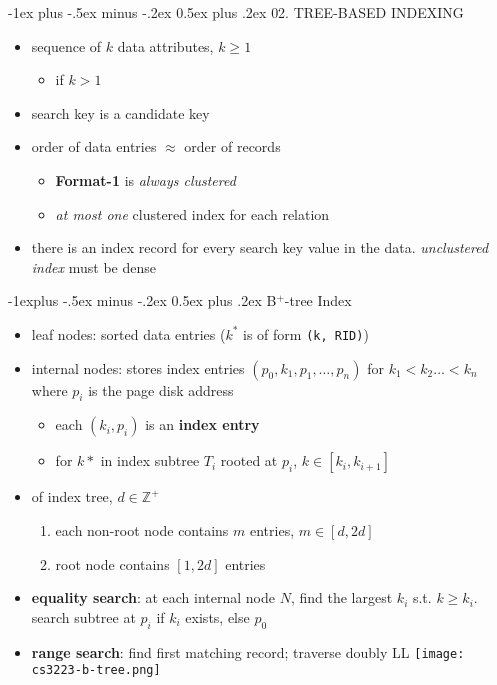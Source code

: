 \documentclass[10pt, landscape]{article}
\makeatletter
\renewcommand{\section}{\@startsection{section}{1}{0mm}%
  {-1ex plus -.5ex minus -.2ex}%
  {0.5ex plus .2ex}%
{\normalfont\large\bfseries}}
\renewcommand{\subsection}{\@startsection{subsection}{2}{0mm}%
  {-1explus -.5ex minus -.2ex}%
  {0.5ex plus .2ex}%
{\normalfont\normalsize\bfseries}}
\makeatother
\begin{document}
\begin{multicols*}{4}
  \section{02. TREE-BASED INDEXING}

  \begin{itemize}
    \item {} sequence of $k$ data attributes, $k \geq 1$ 
      \begin{itemize}
        \item {} if $k > 1$
      \end{itemize}
    \item {} search key is a candidate key
    \item {} order of data entries $\approx$ order of records
      \begin{itemize}
        \item \textbf{Format-1} is \textit{always clustered}
        \item \textit{at most one} clustered index for each relation
      \end{itemize}
    \item {} there is an index record for every search key value in the data. \textit{unclustered index} must be dense
  \end{itemize}


  \subsection{B$^+$-tree Index}

  \begin{itemize}
    \item leaf nodes: sorted data entries ($k^*$ is of form \texttt{(k, RID)})
    \item internal nodes: stores index entries $(p_0, k_1, p_1, \dots, p_n)$ for $k_1 < k_2 \dots <k_n$ where $p_i$ is the page disk address
      \begin{itemize}
        \item each $(k_i, p_i)$ is an \textbf{index entry}
        \item for $k*$ in index subtree $T_i$ rooted at $p_i$, $k \in [k_i, k_{i+1}]$
      \end{itemize}
    \item {} of index tree, $d \in \mathbb{Z}^+$
      \begin{enumerate}
        \item each non-root node contains $m$ entries, $m \in [d, 2d]$
        \item root node contains $[1, 2d]$ entries
      \end{enumerate}
    \item \textbf{equality search}: at each internal node $N$, find the largest $k_i$ s.t. $k \geq k_i$. search subtree at $p_i$ if $k_i$ exists, else $p_0$ 
    \item \textbf{range search}: find first matching record; traverse doubly LL
      \texttt{[image: cs3223-b-tree.png]} 
  \end{itemize}


\end{multicols*}
\end{document}
